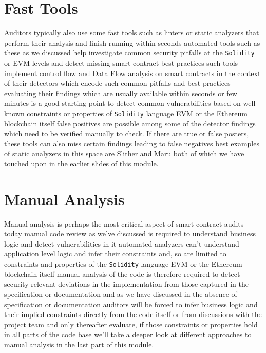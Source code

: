 \section{Fast Tools}

Auditors typically also use some fast tools such as linters or static analyzers that perform their analysis and finish running within seconds automated tools such as these as we discussed help investigate common security pitfalls at the \verb|Solidity| or EVM levels and detect missing smart contract best practices such tools implement control flow and Data Flow analysis on smart contracts in the context of their detectors which encode such common pitfalls and best practices evaluating their findings which are usually available within seconds or few minutes is a good starting point to detect common vulnerabilities based on well-known constraints or properties of \verb|Solidity| language EVM or the Ethereum blockchain itself false positives are possible among some of the detector findings which need to be verified manually to check. If there are true or false posters, these tools can also miss certain findings leading to false negatives best examples of static analyzers in this space are Slither and Maru both of which we have touched upon in the earlier slides of this module.

\section{Manual Analysis}

Manual analysis is perhaps the most critical aspect of smart contract audits today manual code review as we've discussed is required to understand business logic and detect vulnerabilities in it automated analyzers can't understand application level logic and infer their constraints and, so are limited to constraints and properties of the \verb|Solidity| language EVM or the Ethereum blockchain itself manual analysis of the code is therefore required to detect security relevant deviations in the implementation from those captured in the specification or documentation and as we have discussed in the absence of specification or documentation auditors will be forced to infer business logic and their implied constraints directly from the code itself or from discussions with the project team and only thereafter evaluate, if those constraints or properties hold in all parts of the code base we'll take a deeper look at different approaches to manual analysis in the last part of this module.

